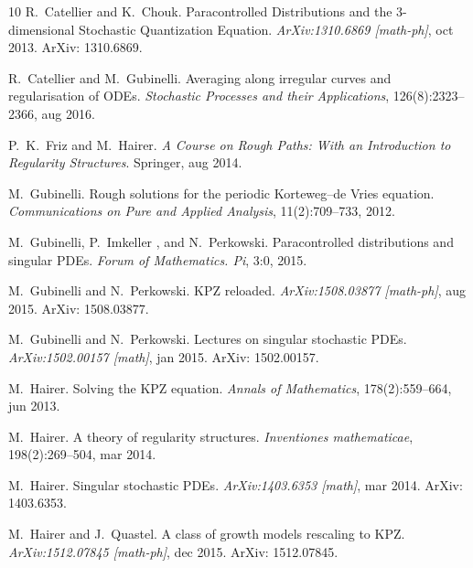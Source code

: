 \documentclass[11pt,reqno]{amsart}
\newcommand{\tmtextit}[1]{{\itshape{#1}}}
\begin{document}
\begin{thebibliography}{10}
  R.~Catellier  and 
  K.~Chouk.{\newblock} Paracontrolled Distributions and the 3-dimensional
  Stochastic Quantization Equation.{\newblock} \tmtextit{ArXiv:1310.6869
  [math-ph]}, oct 2013.{\newblock} ArXiv: 1310.6869.{\newblock}
  
  R.~Catellier  and 
  M.~Gubinelli.{\newblock} Averaging along irregular curves and regularisation
  of ODEs.{\newblock} \tmtextit{Stochastic Processes and their Applications},
  126(8):2323--2366, aug 2016.{\newblock}
  
  P.~K.~Friz  and  M.~Hairer.{\newblock}
  \tmtextit{A Course on Rough Paths: With an Introduction to Regularity
  Structures}.{\newblock} Springer, aug 2014.{\newblock}
  
  M.~Gubinelli.{\newblock} Rough solutions
  for the periodic Korteweg--de Vries equation.{\newblock}
  \tmtextit{Communications on Pure and Applied Analysis}, 11(2):709--733,
  2012.{\newblock}
  
  M.~Gubinelli, P.~Imkeller , and 
  N.~Perkowski.{\newblock} Paracontrolled distributions and singular
  PDEs.{\newblock} \tmtextit{Forum of Mathematics. Pi}, 3:0, 2015.{\newblock}
  
  M.~Gubinelli  and  N.~Perkowski.{\newblock}
  KPZ reloaded.{\newblock} \tmtextit{ArXiv:1508.03877 [math-ph]}, aug
  2015.{\newblock} ArXiv: 1508.03877.{\newblock}
  
  M.~Gubinelli  and 
  N.~Perkowski.{\newblock} Lectures on singular stochastic PDEs.{\newblock}
  \tmtextit{ArXiv:1502.00157 [math]}, jan 2015.{\newblock} ArXiv:
  1502.00157.{\newblock}
  
  M.~Hairer.{\newblock} Solving the KPZ
  equation.{\newblock} \tmtextit{Annals of Mathematics}, 178(2):559--664, jun
  2013.{\newblock}
  
  M.~Hairer.{\newblock} A theory of regularity
  structures.{\newblock} \tmtextit{Inventiones mathematicae}, 198(2):269--504,
  mar 2014.{\newblock}
  
  M.~Hairer.{\newblock} Singular stochastic
  PDEs.{\newblock} \tmtextit{ArXiv:1403.6353 [math]}, mar 2014.{\newblock}
  ArXiv: 1403.6353.{\newblock}
  
  M.~Hairer  and  J.~Quastel.{\newblock} A
  class of growth models rescaling to KPZ.{\newblock}
  \tmtextit{ArXiv:1512.07845 [math-ph]}, dec 2015.{\newblock} ArXiv:
  1512.07845.{\newblock}
  

\end{thebibliography}
\end{document}
